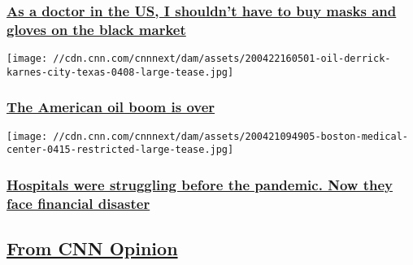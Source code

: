 \hypertarget{as-a-doctor-in-the-us-i-shouldnt-have-to-buy-masks-and-gloves-on-the-black-market}{%
\subsubsection{\texorpdfstring{\href{/2020/04/24/perspectives/ppe-production-shortage/index.html}{As
a doctor in the US, I shouldn't have to buy masks and gloves on the
black
market}}{As a doctor in the US, I shouldn't have to buy masks and gloves on the black market}}\label{as-a-doctor-in-the-us-i-shouldnt-have-to-buy-masks-and-gloves-on-the-black-market}}

\href{/2020/04/23/perspectives/american-oil-boom-end/index.html}{}

\texttt{[image: //cdn.cnn.com/cnnnext/dam/assets/200422160501-oil-derrick-karnes-city-texas-0408-large-tease.jpg]}

\hypertarget{the-american-oil-boom-is-over}{%
\subsubsection{\texorpdfstring{\href{/2020/04/23/perspectives/american-oil-boom-end/index.html}{The
American oil boom is
over}}{The American oil boom is over}}\label{the-american-oil-boom-is-over}}

\href{/2020/04/22/perspectives/hospitals-funding-coronavirus/index.html}{}

\texttt{[image: //cdn.cnn.com/cnnnext/dam/assets/200421094905-boston-medical-center-0415-restricted-large-tease.jpg]}

\hypertarget{hospitals-were-struggling-before-the-pandemic-now-they-face-financial-disaster}{%
\subsubsection{\texorpdfstring{\href{/2020/04/22/perspectives/hospitals-funding-coronavirus/index.html}{Hospitals
were struggling before the pandemic. Now they face financial
disaster}}{Hospitals were struggling before the pandemic. Now they face financial disaster}}\label{hospitals-were-struggling-before-the-pandemic-now-they-face-financial-disaster}}

\hypertarget{from-cnn-opinion-}{%
\subsection{\texorpdfstring{\href{https://www.cnn.com/opinions}{From CNN
Opinion}~}{From CNN Opinion~}}\label{from-cnn-opinion-}}

